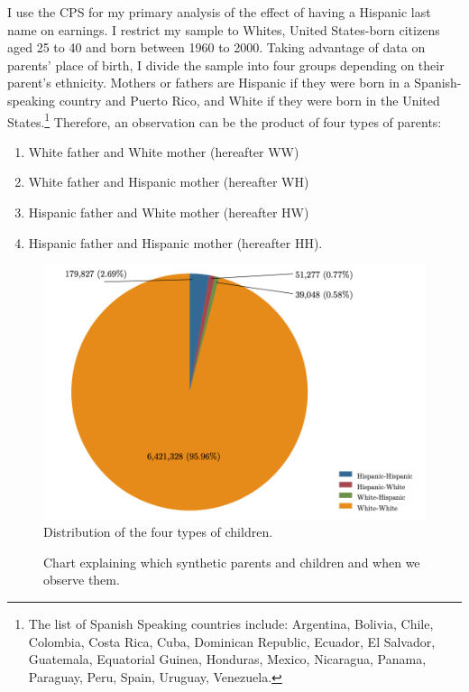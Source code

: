 \documentclass[a4paper,fleqn]{cas-sc}
\begin{document}
I use the CPS for my primary analysis of the effect of having a Hispanic last name on earnings. I restrict my sample to Whites, United States-born citizens aged 25 to 40 and born between 1960 to 2000. Taking advantage of data on parents' place of birth, I divide the sample into four groups depending on their parent's ethnicity. Mothers or fathers are Hispanic if they were born in a Spanish-speaking country and Puerto Rico, and White if they were born in the United States.\footnote{The list of Spanish Speaking countries include: Argentina, Bolivia, Chile, Colombia, Costa Rica, Cuba, Dominican Republic, Ecuador, El Salvador, Guatemala, Equatorial Guinea, Honduras, Mexico, Nicaragua, Panama, Paraguay, Peru, Spain, Uruguay, Venezuela.} Therefore, an observation can be the product of four types of parents:
\begin{enumerate}
\item White father and White mother (hereafter WW)
\item White father and Hispanic mother (hereafter WH)
\item Hispanic father and White mother (hereafter HW)
\item Hispanic father and Hispanic mother (hereafter HH).
\end{enumerate}

\begin{figure}[t]
\centering
\includegraphics[scale=0.4]{Fig/PirChart2.png}
\caption{Distribution of the four types of children.}
\label{fig:dist}
\end{figure}


\begin{figure}[t]
\centering
{}
\caption{Chart explaining which synthetic parents and children and when we observe them.}
\label{flowchart1}
\end{figure}
\end{document}
